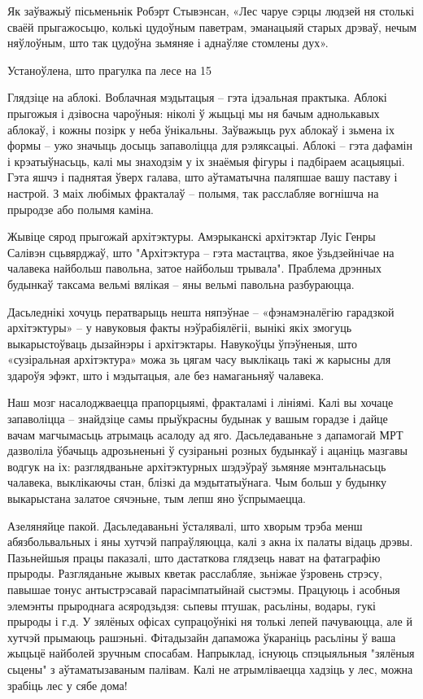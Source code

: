 Як заўважыў пісьменьнік Робэрт Стывэнсан, «Лес чаруе сэрцы людзей ня столькі сваёй прыгажосьцю, колькі цудоўным паветрам, эманацыяй старых дрэваў, нечым няўлоўным, што так цудоўна зьмяняе і аднаўляе стомлены дух».

Устаноўлена, што прагулка па лесе на 15%

Глядзіце на аблокі. Воблачная мэдытацыя – гэта ідэальная практыка. Аблокі прыгожыя і дзівосна чароўныя: ніколі ў жыцьці мы ня бачым аднолькавых аблокаў, і кожны позірк у неба ўнікальны. Заўважыць рух аблокаў і зьмена іх формы – ужо значыць досыць запаволіцца для рэляксацыі. Аблокі – гэта дафамін і крэатыўнасьць, калі мы знаходзім у іх знаёмыя фігуры і падбіраем асацыяцыі. Гэта яшчэ і паднятая ўверх галава, што аўтаматычна паляпшае вашу паставу і настрой. З маіх любімых фракталаў – полымя, так расслабляе вогнішча на прыродзе або полымя каміна.

Жывіце сярод прыгожай архітэктуры. Амэрыканскі архітэктар Луіс Генры Салівэн сцьвярджаў, што "Архітэктура – гэта мастацтва, якое ўзьдзейнічае на чалавека найбольш павольна, затое найбольш трывала". Праблема дрэнных будынкаў таксама вельмі вялікая – яны вельмі павольна разбураюцца. 

Дасьледнікі хочуць ператварыць нешта няпэўнае – «фэнамэналёгію гарадзкой архітэктуры» – у навуковыя факты нэўрабіялёгіі, вынікі якіх змогуць выкарыстоўваць дызайнэры і архітэктары. Навукоўцы ўпэўненыя, што «сузіральная архітэктура» можа зь цягам часу выклікаць такі ж карысны для здароўя эфэкт, што і мэдытацыя, але без намаганьняў чалавека.

Наш мозг насалоджваецца прапорцыямі, фракталамі і лініямі. Калі вы хочаце запаволіцца – знайдзіце самы прыўкрасны будынак у вашым горадзе і дайце вачам магчымасьць атрымаць асалоду ад яго. Дасьледаваньне з дапамогай МРТ дазволіла ўбачыць адрозьненьні ў сузіраньні розных будынкаў і ацаніць мазгавы водгук на іх: разглядваньне архітэктурных шэдэўраў зьмяняе мэнтальнасьць чалавека, выклікаючы стан, блізкі да мэдытатыўнага. Чым больш у будынку выкарыстана залатое сячэньне, тым лепш яно ўспрымаецца.

Азеляняйце пакой. Дасьледаваньні ўсталявалі, што хворым трэба менш абязбольвальных і яны хутчэй папраўляюцца, калі з акна іх палаты відаць дрэвы. Пазьнейшыя працы паказалі, што дастаткова глядзець нават на фатаграфію прыроды. Разгляданьне жывых кветак расслабляе, зьніжае ўзровень стрэсу, павышае тонус антыстрэсавай парасімпатыйнай сыстэмы. Працуюць і асобныя элемэнты прыроднага асяродзьдзя: сьпевы птушак, расьліны, водары, гукі прыроды і г.д. У зялёных офісах супрацоўнікі ня толькі лепей пачуваюцца, але й хутчэй прымаюць рашэньні. Фітадызайн дапаможа ўкараніць расьліны ў ваша жыцьцё найболей зручным спосабам. Напрыклад, існуюць спэцыяльныя "зялёныя сьцены" з аўтаматызаваным палівам. Калі не атрымліваецца хадзіць у лес, можна зрабіць лес у сябе дома!


